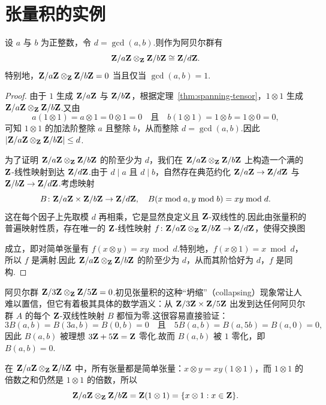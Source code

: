 \section{张量积的实例}
\label{sec:examples}

\begin{theorem}\label{thm:cyclic-tensor}
设 $a$ 与 $b$ 为正整数，令 $d = \gcd(a, b)$.则作为阿贝尔群有
\[
  \mathbf{Z}/a\mathbf{Z} \otimes_{\mathbf{Z}} \mathbf{Z}/b\mathbf{Z} \cong \mathbf{Z}/d\mathbf{Z}.
\]
特别地，$\mathbf{Z}/a\mathbf{Z} \otimes_{\mathbf{Z}} \mathbf{Z}/b\mathbf{Z} = 0$ 当且仅当 $\gcd(a, b) = 1$.
\end{theorem}

\begin{proof}
由于 $1$ 生成 $\mathbf{Z}/a\mathbf{Z}$ 与 $\mathbf{Z}/b\mathbf{Z}$，根据定理~\ref{thm:spanning-tensor}，$1 \otimes 1$ 生成 $\mathbf{Z}/a\mathbf{Z} \otimes_{\mathbf{Z}} \mathbf{Z}/b\mathbf{Z}$.又由
\[
  a(1 \otimes 1) = a \otimes 1 = 0 \otimes 1 = 0 \quad\text{且}\quad b(1 \otimes 1) = 1 \otimes b = 1 \otimes 0 = 0,
\]
可知 $1 \otimes 1$ 的加法阶整除 $a$ 且整除 $b$，从而整除 $d = \gcd(a, b)$.因此 $|\mathbf{Z}/a\mathbf{Z} \otimes_{\mathbf{Z}} \mathbf{Z}/b\mathbf{Z}| \leq d$.

为了证明 $\mathbf{Z}/a\mathbf{Z} \otimes_{\mathbf{Z}} \mathbf{Z}/b\mathbf{Z}$ 的阶至少为 $d$，我们在 $\mathbf{Z}/a\mathbf{Z} \otimes_{\mathbf{Z}} \mathbf{Z}/b\mathbf{Z}$ 上构造一个满的 $\mathbf{Z}$-线性映射到达 $\mathbf{Z}/d\mathbf{Z}$.由于 $d \mid a$ 且 $d \mid b$，自然存在典范约化 $\mathbf{Z}/a\mathbf{Z} \to \mathbf{Z}/d\mathbf{Z}$ 与 $\mathbf{Z}/b\mathbf{Z} \to \mathbf{Z}/d\mathbf{Z}$.考虑映射
\[
  B \colon \mathbf{Z}/a\mathbf{Z} \times \mathbf{Z}/b\mathbf{Z} \to \mathbf{Z}/d\mathbf{Z}, \quad B(x \bmod a, y \bmod b) = xy \bmod d.
\]
这在每个因子上先取模 $d$ 再相乘，它是显然良定义且 $\mathbf{Z}$-双线性的.因此由张量积的普遍映射性质，存在唯一的 $\mathbf{Z}$-线性映射 $f \colon \mathbf{Z}/a\mathbf{Z} \otimes_{\mathbf{Z}} \mathbf{Z}/b\mathbf{Z} \to \mathbf{Z}/d\mathbf{Z}$，使得交换图
\begin{center}
\end{center}
成立，即对简单张量有 $f(x \otimes y) = xy \bmod d$.特别地，$f(x \otimes 1) = x \bmod d$，所以 $f$ 是满射.因此 $\mathbf{Z}/a\mathbf{Z} \otimes_{\mathbf{Z}} \mathbf{Z}/b\mathbf{Z}$ 的阶至少为 $d$，从而其阶恰好为 $d$，$f$ 是同构.
\end{proof}

\begin{example}\label{ex:3-5-collapse}
阿贝尔群 $\mathbf{Z}/3\mathbf{Z} \otimes_{\mathbf{Z}} \mathbf{Z}/5\mathbf{Z} = 0$.初见张量积的这种``坍缩''（collapsing）现象常让人难以置信，但它有着极其具体的数学涵义：从 $\mathbf{Z}/3\mathbf{Z} \times \mathbf{Z}/5\mathbf{Z}$ 出发到达任何阿贝尔群 $A$ 的每个 $\mathbf{Z}$-双线性映射 $B$ 都恒为零.这很容易直接验证：
\[
  3B(a, b) = B(3a, b) = B(0, b) = 0 \quad\text{且}\quad 5B(a, b) = B(a, 5b) = B(a, 0) = 0,
\]
因此 $B(a, b)$ 被理想 $3\mathbf{Z} + 5\mathbf{Z} = \mathbf{Z}$ 零化.故而 $B(a, b)$ 被 $1$ 零化，即 $B(a, b) = 0$.

在 $\mathbf{Z}/a\mathbf{Z} \otimes_{\mathbf{Z}} \mathbf{Z}/b\mathbf{Z}$ 中，所有张量都是简单张量：$x \otimes y = xy(1 \otimes 1)$，而 $1 \otimes 1$ 的倍数之和仍然是 $1 \otimes 1$ 的倍数，所以
\[
  \mathbf{Z}/a\mathbf{Z} \otimes_{\mathbf{Z}} \mathbf{Z}/b\mathbf{Z} = \mathbf{Z}(1 \otimes 1) = \{x \otimes 1 : x \in \mathbf{Z}\}.
\]
\end{example}

